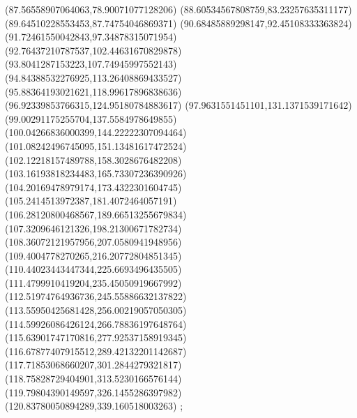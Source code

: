 {(87.56558907064063,78.90071077128206)
(88.60534567808759,83.23257635311177)
(89.64510228553453,87.74754046869371)
(90.68485889298147,92.45108333363824)
(91.72461550042843,97.34878315071954)
(92.76437210787537,102.44631670829878)
(93.8041287153223,107.74945997552143)
(94.84388532276925,113.26408869433527)
(95.88364193021621,118.99617896838636)
(96.92339853766315,124.95180784883617)
(97.9631551451101,131.1371539171642)
(99.00291175255704,137.5584978649855)
(100.04266836000399,144.22222307094464)
(101.08242496745095,151.13481617472524)
(102.12218157489788,158.3028676482208)
(103.16193818234483,165.73307236390926)
(104.20169478979174,173.4322301604745)
(105.2414513972387,181.4072464057191)
(106.28120800468567,189.66513255679834)
(107.3209646121326,198.21300671782734)
(108.36072121957956,207.0580941948956)
(109.4004778270265,216.20772804851345)
(110.44023443447344,225.6693496435505)
(111.4799910419204,235.45050919667992)
(112.51974764936736,245.55886632137822)
(113.55950425681428,256.00219057050305)
(114.59926086426124,266.78836197648764)
(115.63901747170816,277.92537158919345)
(116.67877407915512,289.42132201142687)
(117.71853068660207,301.2844279321817)
(118.75828729404901,313.5230166576144)
(119.79804390149597,326.1455286397982)
(120.83780050894289,339.160518003263)
};
